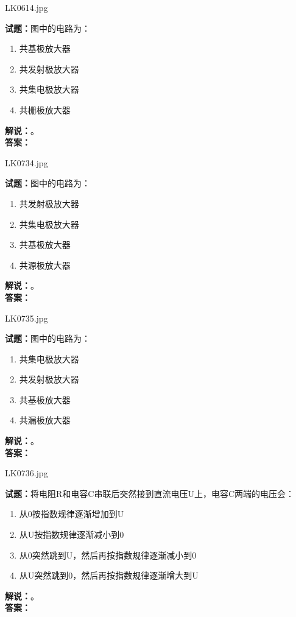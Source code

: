 \documentclass{ctexbook}
\begin{document}
\vspace{\baselineskip}

LK0614.jpg

\noindent\textbf{试题：}图中的电路为：
\begin{enumerate}[leftmargin=3em]
  \item 共基极放大器
  \item 共发射极放大器
  \item 共集电极放大器
  \item 共栅极放大器
\end{enumerate}
\noindent\textbf{解说：}\textbf{}。\\\noindent\textbf{答案：}

\vspace{\baselineskip}

LK0734.jpg

\noindent\textbf{试题：}图中的电路为：
\begin{enumerate}[leftmargin=3em]
  \item 共发射极放大器
  \item 共集电极放大器
  \item 共基极放大器
  \item 共源极放大器
\end{enumerate}
\noindent\textbf{解说：}\textbf{}。\\\noindent\textbf{答案：}

\vspace{\baselineskip}

LK0735.jpg

\noindent\textbf{试题：}图中的电路为：
\begin{enumerate}[leftmargin=3em]
  \item 共集电极放大器
  \item 共发射极放大器
  \item 共基极放大器
  \item 共漏极放大器
\end{enumerate}
\noindent\textbf{解说：}\textbf{}。\\\noindent\textbf{答案：}

\vspace{\baselineskip}

LK0736.jpg

\noindent\textbf{试题：}将电阻R和电容C串联后突然接到直流电压U上，电容C两端的电压会：
\begin{enumerate}[leftmargin=3em]
  \item 从0按指数规律逐渐增加到U
  \item 从U按指数规律逐渐减小到0
  \item 从0突然跳到U，然后再按指数规律逐渐减小到0
  \item 从U突然跳到0，然后再按指数规律逐渐增大到U
\end{enumerate}
\noindent\textbf{解说：}\textbf{}。\\\noindent\textbf{答案：}
\end{document}
